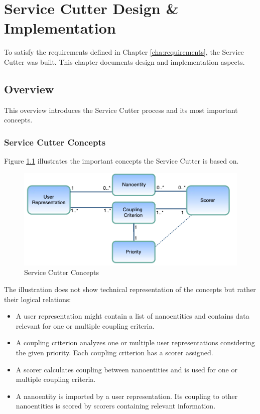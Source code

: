 
\chapter{Service Cutter Design \& Implementation}
\label{cha:implementation}

To satisfy the requirements defined in Chapter \ref{cha:requirements}, the Service Cutter was built. This chapter documents design and implementation aspects.

\section{Overview}

This overview introduces the Service Cutter process and its most important concepts.

\subsection{Service Cutter Concepts}

Figure \ref{fig:concepts} illustrates the important concepts the Service Cutter is based on.

\begin{figure}[H]
	\begin{center}
		\includegraphics[scale=0.8]{diagrams/concepts.pdf}
		\caption{Service Cutter Concepts}
		\label{fig:concepts}
	\end{center}
\end{figure}

The illustration does not show technical representation of the concepts but rather their logical relations:

\begin{itemize}
	\item A user representation might contain a list of nanoentities and contains data relevant for one or multiple coupling criteria.
	\item A coupling criterion analyzes one or multiple user representations considering the given priority. Each coupling criterion has a scorer assigned. 
	\item A scorer calculates coupling between nanoentities and is used for one or multiple coupling criteria.
	\item A nanoentity is imported by a user representation. Its coupling to other nanoentities is scored by scorers containing relevant information.
\end{itemize}

